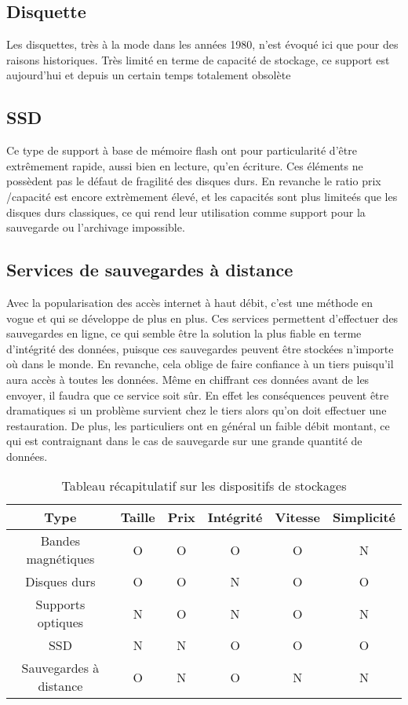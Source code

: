 \documentclass[a4paper,11pt]{report}
\begin{document}
\subsection{Disquette}
Les disquettes, très à la mode dans les années 1980, n'est évoqué ici que pour des raisons historiques.
Très limité en terme de capacité de stockage, ce support est aujourd'hui et depuis un certain temps totalement obsolète

\subsection{SSD}
Ce type de support à base de mémoire flash ont pour particularité d'être extrêmement rapide, aussi bien en lecture, qu'en écriture.
Ces éléments ne possèdent pas le défaut de fragilité des disques durs.
En revanche le ratio prix \slash capacité est encore extrèmement élevé, et les capacités sont plus limiteés que les disques durs classiques, ce qui rend leur utilisation comme support pour la sauvegarde ou l'archivage impossible.

\subsection{Services de sauvegardes à distance}
Avec la popularisation des accès internet à haut débit, c'est une méthode en vogue et qui se développe de plus en plus.
Ces services permettent d'effectuer des sauvegardes en ligne, ce qui semble être la solution la plus fiable en terme d'intégrité des données, puisque ces sauvegardes peuvent être stockées n'importe où dans le monde.
En revanche, cela oblige de faire confiance à un tiers puisqu'il aura accès à toutes les données. Même en chiffrant ces données avant de les envoyer, il faudra que ce service soit sûr. En effet les conséquences peuvent être dramatiques si un problème survient chez le tiers alors qu'on doit effectuer une restauration.
De plus, les particuliers ont en général un faible débit montant, ce qui est contraignant dans le cas de sauvegarde sur une grande quantité de données.

\begin{table}[h]
 \begin{center}
 \begin{tabular}{|c|c|c|c|c|c|}
  \hline
    Type & Taille & Prix & Intégrité & Vitesse & Simplicité\\
  \hline
    Bandes magnétiques & O & O & O & O & N \\
  \hline
    Disques durs & O & O & N & O & O \\
  \hline
    Supports optiques  & N & O & N & O & N \\
  \hline
    SSD & N & N & O & O & O \\
  \hline
    Sauvegardes à distance & O & N & O & N & N \\
  \hline
 \end{tabular}
 \caption{Tableau récapitulatif sur les dispositifs de stockages}
 \end{center}
\end{table}
\end{document}

